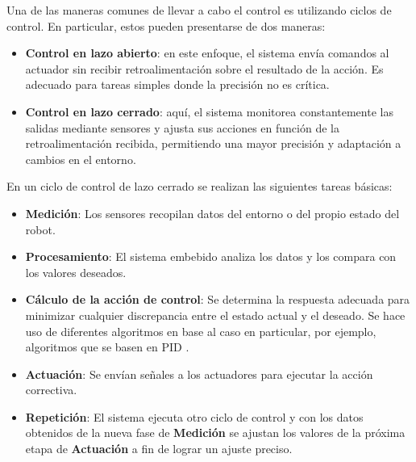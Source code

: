 Una de las maneras comunes de llevar a cabo el control es utilizando ciclos de control. En particular, estos pueden presentarse de dos maneras:

\begin{itemize} \item \textbf{Control en lazo abierto}: en este enfoque, el sistema envía comandos al actuador sin recibir retroalimentación sobre el resultado de la acción. Es adecuado para tareas simples donde la precisión no es crítica.
\item \textbf{Control en lazo cerrado}: aquí, el sistema monitorea constantemente las salidas mediante sensores y ajusta sus acciones en función de la retroalimentación recibida, permitiendo una mayor precisión y adaptación a cambios en el entorno.
\end{itemize}

En un ciclo de control de lazo cerrado se realizan las siguientes tareas básicas:

\begin{itemize} \item \textbf{Medición}: Los sensores recopilan datos del entorno o del propio estado del robot.
\item \textbf{Procesamiento}: El sistema embebido analiza los datos y los compara con los valores deseados.
\item \textbf{Cálculo de la acción de control}: Se determina la respuesta adecuada para minimizar cualquier discrepancia entre el estado actual y el deseado. Se hace uso de diferentes algoritmos en base al caso en particular, por ejemplo, algoritmos que se basen en \gls{PID} \cite{feedBackPID}.
\item \textbf{Actuación}: Se envían señales a los actuadores para ejecutar la acción correctiva.
\item \textbf{Repetición}: El sistema ejecuta otro ciclo de control y con los datos obtenidos de la nueva fase de \textbf{Medición} se ajustan los valores de la próxima etapa de \textbf{Actuación} a fin de lograr un ajuste preciso.
\end{itemize}















